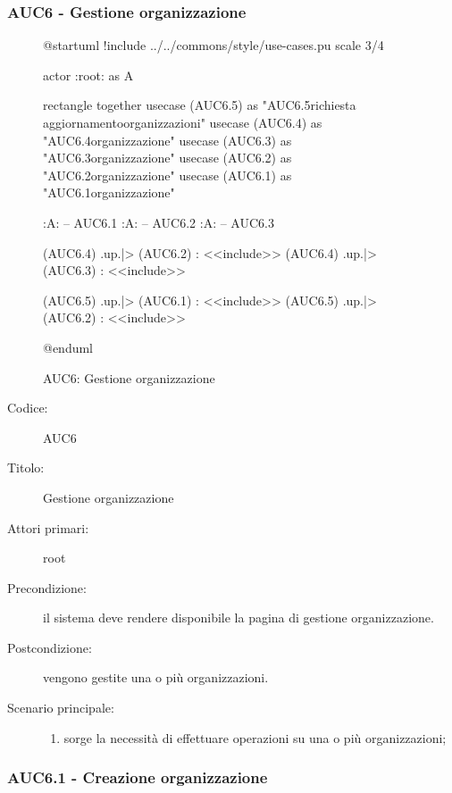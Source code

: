 \documentclass[casi-duso]{subfiles}
\begin{document}
\subsubsection{AUC6 - Gestione organizzazione}%
\label{subsub:AUC6}

\begin{figure}[h!]
  \centering
  \begin{plantuml}
  @startuml
  !include ../../commons/style/use-cases.pu
  scale 3/4

  actor :root: as A

  rectangle {
    together {
      usecase (AUC6.5) as "AUC6.5\nInvio richiesta aggiornamento\nlista organizzazioni"
      usecase (AUC6.4) as "AUC6.4\nSeleziona organizzazione"
      usecase (AUC6.3) as "AUC6.3\nModifica organizzazione"
      usecase (AUC6.2) as "AUC6.2\nEliminazione organizzazione"
      usecase (AUC6.1) as "AUC6.1\nCreazione organizzazione"
    }
  }

  :A: -- AUC6.1
  :A: -- AUC6.2
  :A: -- AUC6.3

  (AUC6.4) .up.|> (AUC6.2) : <<include>>
  (AUC6.4) .up.|> (AUC6.3) : <<include>>

  (AUC6.5) .up.|> (AUC6.1) : <<include>>
  (AUC6.5) .up.|> (AUC6.2) : <<include>>

  @enduml
  \end{plantuml}
  \caption{AUC6: Gestione organizzazione}
  \label{fig:auc6}
\end{figure}

\begin{description}
  \item[Codice:] AUC6
  \item[Titolo:] Gestione organizzazione
  \item[Attori primari:] root
  \item[Precondizione:] il sistema deve rendere disponibile la pagina di gestione organizzazione.
  \item[Postcondizione:] vengono gestite una o più organizzazioni.
  \item[Scenario principale:]
  \begin{enumerate}
    \item sorge la necessità di effettuare operazioni su una o più organizzazioni;
  \end{enumerate}
\end{description}

  \subsubsection{AUC6.1 - Creazione organizzazione}%
  \label{subsub:AUC6.1}
\end{document}
